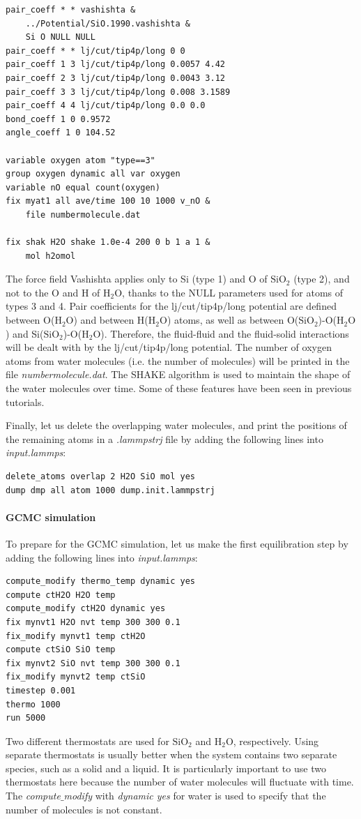\documentclass[9pt,tutorial]{livecoms}
\begin{document}
{\normalsize \begin{verbatim}
pair_coeff * * vashishta &
    ../Potential/SiO.1990.vashishta &
    Si O NULL NULL
pair_coeff * * lj/cut/tip4p/long 0 0
pair_coeff 1 3 lj/cut/tip4p/long 0.0057 4.42
pair_coeff 2 3 lj/cut/tip4p/long 0.0043 3.12
pair_coeff 3 3 lj/cut/tip4p/long 0.008 3.1589
pair_coeff 4 4 lj/cut/tip4p/long 0.0 0.0
bond_coeff 1 0 0.9572
angle_coeff 1 0 104.52

variable oxygen atom "type==3"
group oxygen dynamic all var oxygen
variable nO equal count(oxygen)
fix myat1 all ave/time 100 10 1000 v_nO &
    file numbermolecule.dat

fix shak H2O shake 1.0e-4 200 0 b 1 a 1 &
    mol h2omol
\end{verbatim}}
The force field Vashishta applies only to Si (type 1) and O of $\text{SiO}_2$ (type 2), and not to the O and H of $\text{H}_2\text{O}$, thanks to the NULL parameters used for atoms of types 3 and 4. Pair coefficients for the lj/cut/tip4p/long potential are defined between O($\text{H}_2\text{O}$) and between H($\text{H}_2\text{O}$) atoms, as well as between O($\text{SiO}_2$)-O($\text{H}_2\text{O}$) and Si($\text{SiO}_2$)-O($\text{H}_2\text{O}$). Therefore, the fluid-fluid and the fluid-solid interactions will be dealt with by the lj/cut/tip4p/long potential. The number of oxygen atoms from water molecules (i.e. the number of molecules) will be printed in the file \textit{numbermolecule.dat}. The SHAKE algorithm is used to maintain the shape of the water molecules over time. Some of
these features have been seen in previous tutorials.

Finally, let us delete the overlapping water molecules, and print the
positions of the remaining atoms in a \textit{.lammpstrj} file by adding the following lines into \textit{input.lammps}:
{\normalsize \begin{verbatim}
delete_atoms overlap 2 H2O SiO mol yes
dump dmp all atom 1000 dump.init.lammpstrj
\end{verbatim}}

\paragraph{GCMC simulation}
To prepare for the GCMC simulation, let us make the first equilibration step by adding the following lines into \textit{input.lammps}:
{\normalsize \begin{verbatim}
compute_modify thermo_temp dynamic yes
compute ctH2O H2O temp
compute_modify ctH2O dynamic yes
fix mynvt1 H2O nvt temp 300 300 0.1
fix_modify mynvt1 temp ctH2O
compute ctSiO SiO temp
fix mynvt2 SiO nvt temp 300 300 0.1
fix_modify mynvt2 temp ctSiO
timestep 0.001
thermo 1000
run 5000
\end{verbatim}}
Two different thermostats are used for $\text{SiO}_2$ and $\text{H}_2\text{O}$, respectively. Using separate thermostats is usually better when the system contains two separate species, such as a solid and a liquid. It is particularly important to use two thermostats
here because the number of water molecules will fluctuate with time. The \textit{compute$\_$modify} with
\textit{dynamic yes} for water is used to specify that the number of molecules is not constant.
\end{document}
